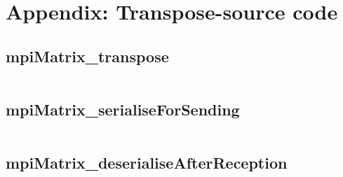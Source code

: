\newpage
\appendix
\section{Appendix: Transpose-source code}

\subsection{mpiMatrix\_transpose}
\inputminted{c}{transpose.c}
\subsection{mpiMatrix\_serialiseForSending}
\inputminted{c}{serialise.c}
\subsection{mpiMatrix\_deserialiseAfterReception}
\inputminted{c}{deserialise.c}